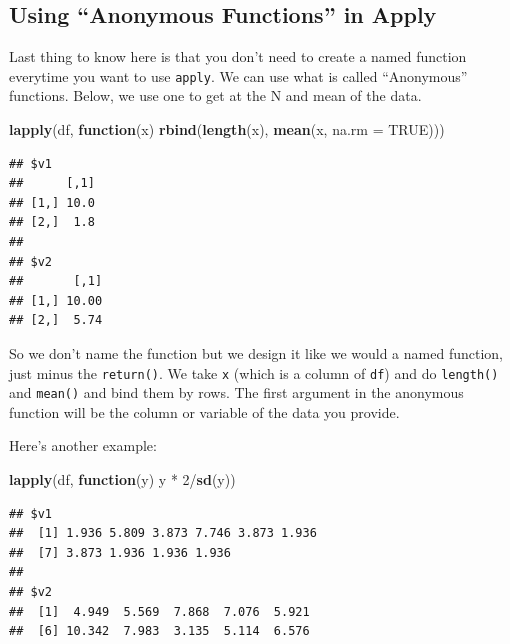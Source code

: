\documentclass[]{tufte-book}
\newenvironment{Shaded}{}{}
\newcommand{\KeywordTok}[1]{\textcolor[rgb]{0.00,0.44,0.13}{\textbf{#1}}}
\newcommand{\DataTypeTok}[1]{\textcolor[rgb]{0.56,0.13,0.00}{#1}}
\newcommand{\DecValTok}[1]{\textcolor[rgb]{0.25,0.63,0.44}{#1}}
\newcommand{\StringTok}[1]{\textcolor[rgb]{0.25,0.44,0.63}{#1}}
\newcommand{\OtherTok}[1]{\textcolor[rgb]{0.00,0.44,0.13}{#1}}
\newcommand{\ControlFlowTok}[1]{\textcolor[rgb]{0.00,0.44,0.13}{\textbf{#1}}}
\newcommand{\OperatorTok}[1]{\textcolor[rgb]{0.40,0.40,0.40}{#1}}
\newcommand{\NormalTok}[1]{#1}
\theoremstyle{definition}
\theoremstyle{definition}
\theoremstyle{remark}
\begin{document}
\subsection*{\texorpdfstring{Using ``Anonymous Functions'' in
Apply}{Using Anonymous Functions in Apply}}\label{using-anonymous-functions-in-apply}

Last thing to know here is that you don't need to create a named
function everytime you want to use \texttt{apply}. We can use what is
called ``Anonymous'' functions. Below, we use one to get at the N and
mean of the data.

\begin{Shaded}
\begin{Highlighting}[]
\KeywordTok{lapply}\NormalTok{(df, }\ControlFlowTok{function}\NormalTok{(x) }\KeywordTok{rbind}\NormalTok{(}\KeywordTok{length}\NormalTok{(x), }\KeywordTok{mean}\NormalTok{(x, }
    \DataTypeTok{na.rm =} \OtherTok{TRUE}\NormalTok{)))}
\end{Highlighting}
\end{Shaded}

\begin{verbatim}
## $v1
##      [,1]
## [1,] 10.0
## [2,]  1.8
## 
## $v2
##       [,1]
## [1,] 10.00
## [2,]  5.74
\end{verbatim}

So we don't name the function but we design it like we would a named
function, just minus the \texttt{return()}. We take \texttt{x} (which is
a column of \texttt{df}) and do \texttt{length()} and \texttt{mean()}
and bind them by rows. The first argument in the anonymous function will
be the column or variable of the data you provide.

Here's another example:

\begin{Shaded}
\begin{Highlighting}[]
\KeywordTok{lapply}\NormalTok{(df, }\ControlFlowTok{function}\NormalTok{(y) y }\OperatorTok{*}\StringTok{ }\DecValTok{2}\OperatorTok{/}\KeywordTok{sd}\NormalTok{(y))}
\end{Highlighting}
\end{Shaded}

\begin{verbatim}
## $v1
##  [1] 1.936 5.809 3.873 7.746 3.873 1.936
##  [7] 3.873 1.936 1.936 1.936
## 
## $v2
##  [1]  4.949  5.569  7.868  7.076  5.921
##  [6] 10.342  7.983  3.135  5.114  6.576
\end{verbatim}
\end{document}
